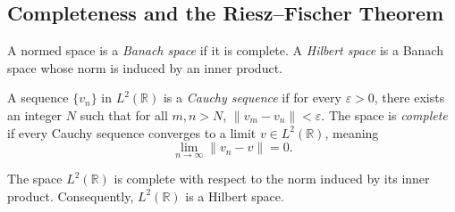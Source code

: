 \subsection{Completeness and the Riesz--Fischer Theorem}

A normed space is a \textit{Banach space} if it is complete. A \textit{Hilbert space} is a Banach space whose norm is induced by an inner product.

\begin{definition}
A sequence $\{v_n\}$ in $L^2(\mathbb{R})$ is a \textit{Cauchy sequence} if for every $\varepsilon > 0$, there exists an integer $N$ such that for all $m, n > N$, $\|v_m - v_n\| < \varepsilon$.
The space is \textit{complete} if every Cauchy sequence converges to a limit $v \in L^2(\mathbb{R})$, meaning
\[
\lim_{n \to \infty} \|v_n - v\| = 0.
\]

\end{definition}

\begin{theorem}
The space $L^2(\mathbb{R})$ is complete with respect to the norm induced by its inner product. Consequently, $L^2(\mathbb{R})$ is a Hilbert space.
\end{theorem}

